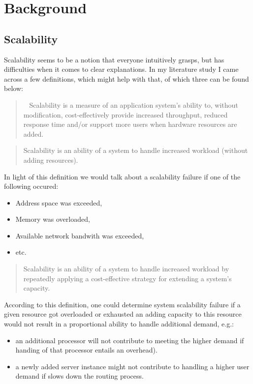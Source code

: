 \documentclass{uvamscse}
\begin{document}

\chapter{Background}\label{Background}

\section{Scalability}\label{Scalability}

Scalability seems to be a notion that everyone intuitively grasps, but has difficulties when it comes to clear explanations. In my literature study I came across a few definitions, which might help with that, of which three can be found below:

\begin{quote}
~\cite{Williams04} Scalability is a measure of an application system’s ability to, without modification, cost-effectively provide increased throughput, reduced response time and/or support more users when hardware resources are added.
\end{quote}

\begin{quote}
\cite{WeinstockOnSystem2006} Scalability is an ability of a system to handle increased workload (without adding resources).
\end{quote}\label{x}
In light of this definition we would talk about a scalability failure if one of the following occured:
\begin{itemize}
  \item Address space was exceeded,
  \item Memory was overloaded,
  \item Available network bandwith was exceeded,
  \item etc.
\end{itemize}

\begin{quote}
\cite{WeinstockOnSystem2006} Scalability is an ability of a system to handle increased workload by repeatedly applying a cost-effective strategy for extending a system’s capacity.
\end{quote}
According to this definition, one could determine system scalability failure if a given resource got overloaded or exhausted an adding capacity to this resource would not result in a proportional ability to handle additional demand, e.g.:
\begin{itemize}
  \item an additional processor will not contribute to meeting the higher demand if handing of that processor entails an overhead).
  \item a newly added server instance might not contribute to handling a higher user demand if slows down the routing process.
\end{itemize}
\end{document}
